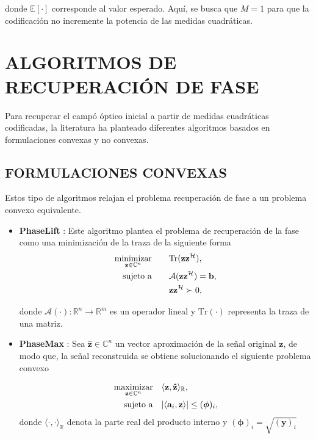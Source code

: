 donde $\mathbb{E}[\cdot]$ corresponde al valor esperado. Aquí, se busca que $M=1$ para que la codificación no incremente la potencia de las medidas cuadráticas.

\chapter{ALGORITMOS DE RECUPERACIÓN DE FASE}
Para recuperar el campó óptico inicial a partir de medidas cuadráticas codificadas, la literatura ha planteado diferentes algoritmos basados en formulaciones convexas y no convexas.

\section{FORMULACIONES CONVEXAS}

Estos tipo de algoritmos relajan el problema recuperación de fase a un problema convexo equivalente.

\begin{itemize}
    \item \textbf{PhaseLift }:
    Este algoritmo plantea el problema de recuperación de la fase como una minimización de la traza de la siguiente forma
    \begin{equation}
        \begin{aligned}
            \operatorname*{minimizar}_{\mathbf{z} \in \mathbb{C}^{n}} \quad & \quad \mathrm{Tr}(\mathbf{z}\mathbf{z}^{\mathcal{H}}), \\
            \operatorname*{sujeto \ a} \quad & \quad \mathcal{A}(\mathbf{z}\mathbf{z}^{\mathcal{H}}) = \mathbf{b}, \\
             &\quad  \mathbf{z}\mathbf{z}^{\mathcal{H}} \succ 0,
        \end{aligned}
    \end{equation}
    
    donde $\mathcal{A}( \cdot ): \mathbb{R}^{n} \rightarrow \mathbb{R}^{m}$ es un operador lineal y $\mathrm{Tr}(\cdot)$ representa la traza de una matriz.
    
    \item \textbf{PhaseMax} :
    Sea $\mathbf{\hat{z}} \in \mathbb{C}^{n}$ un vector aproximación de la señal original $\mathbf{z}$, de modo que, la señal reconstruida se obtiene solucionando el siguiente problema convexo
        
    \begin{equation}
        \begin{aligned}
            \operatorname*{maximizar}_{\mathbf{z}\in \mathbb{C}^n} \quad & \langle \mathbf{z}, \mathbf{\hat{z}} \rangle_{\mathbb{R}}, \\
            \operatorname*{sujeto \ a} \quad & \vert \langle \mathbf{a}_i,\mathbf{z} \rangle \vert \leq (\boldsymbol{\phi})_i,
        \end{aligned}
    \end{equation}
    donde $\langle \cdot, \cdot \rangle_{\mathbb{R}}$ denota la parte real del producto interno y $(\boldsymbol{\phi})_i = \sqrt{(\mathbf{y})_i}$
    
\end{itemize}

